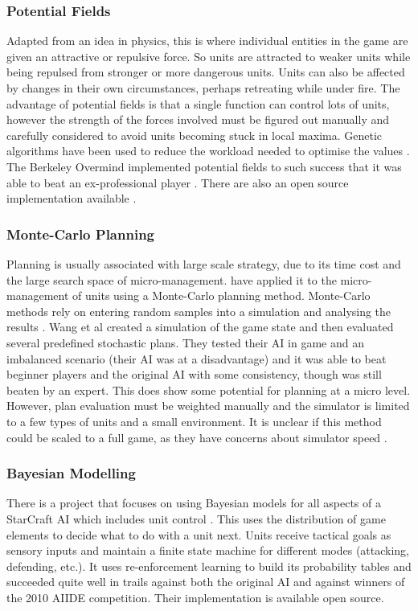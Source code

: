 \documentclass[11pt,openright,a4paper]{report}
\begin{document}
\subsubsection{Potential Fields}
Adapted from an idea in physics, this is where individual entities in the game are given an attractive or repulsive force. So units are attracted to weaker units while being repulsed from stronger or more dangerous units. Units can also be affected by changes in their own circumstances, perhaps retreating while under fire. The advantage of potential fields is that a single function can control lots of units, however the strength of the forces involved must be figured out manually and carefully considered to avoid units becoming stuck in local maxima. Genetic algorithms have been used to reduce the workload needed to optimise the values \cite{rathe2012micromanagement}. The Berkeley Overmind \cite{BerkeleyOvermind} implemented potential fields to such success that it was able to beat an ex-professional player \cite{OvermindArticle}. There are also an open source implementation available \cite{AIBot}.

\subsubsection{Monte-Carlo Planning}
Planning is usually associated with large scale strategy, due to its time cost and the large search space of micro-management.  have applied it to the micro-management of units using a Monte-Carlo planning method. Monte-Carlo methods rely on entering random samples into a simulation and analysing the results \cite{MonteCarlo}. Wang et al created a simulation of the game state and then evaluated several predefined stochastic plans. They tested their AI in game and an imbalanced scenario (their AI was at a disadvantage) and it was able to beat beginner players and the original AI with some consistency, though was still beaten by an expert. This does show some potential for planning at a micro level. However, plan evaluation must be weighted manually and the simulator is limited to a few types of units and a small environment. It is unclear if this method could be scaled to a full game, as they have concerns about simulator speed .

\subsubsection{Bayesian Modelling}
There is a project that focuses on using Bayesian models for all aspects of a StarCraft AI \cite{synnaeve2012bayesian} which includes unit control \cite{synnaeve2011bayesian}. This uses the distribution of game elements to decide what to do with a unit next. Units receive tactical goals as sensory inputs and maintain a finite state machine for different modes (attacking, defending, etc.). It uses re-enforcement learning to build its probability tables and succeeded quite well in trails against both the original AI and against winners of the 2010 AIIDE competition. Their implementation is available open source.
\end{document}
